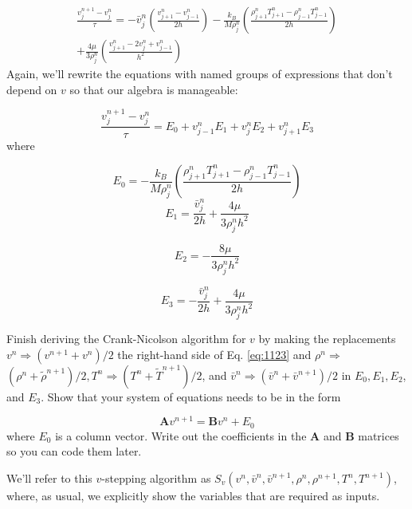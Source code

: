 \begin{equation}\label{eq:1122}
\begin{array}{r}
\frac{v_{j}^{n+1}-v_{j}^{n}}{\tau}=-\bar{v}_{j}^{n}\left(\frac{v_{j+1}^{n}-v_{j-1}^{n}}{2 h}\right)-\frac{k_{B}}{M \rho_{j}^{n}}\left(\frac{\rho_{j+1}^{n} T_{j+1}^{n}-\rho_{j-1}^{n} T_{j-1}^{n}}{2 h}\right) \\
+\frac{4 \mu}{3 \rho_{j}^{n}}\left(\frac{v_{j+1}^{n}-2 v_{j}^{n}+v_{j-1}^{n}}{h^{2}}\right)
\end{array}
\end{equation}
Again, we\rq ll rewrite the equations with named groups of expressions that don\rq t
depend on $v$ so that our algebra is manageable:


\begin{equation}\label{eq:1123}
\frac{v_{j}^{n+1}-v_{j}^{n}}{\tau}=E_{0}+v_{j-1}^{n} E_{1}+v_{j}^{n} E_{2}+v_{j+1}^{n} E_{3}
\end{equation}
where

\begin{equation}\label{eq:1124}
E_{0}=-\frac{k_{B}}{M \rho_{j}^{n}}\left(\frac{\rho_{j+1}^{n} T_{j+1}^{n}-\rho_{j-1}^{n} T_{j-1}^{n}}{2 h}\right)
\end{equation}
\begin{equation}\label{eq:1125}
E_{1}=\frac{\bar{v}_{j}^{n}}{2 h}+\frac{4 \mu}{3 \rho_{j}^{n} h^{2}}
\end{equation}

\begin{equation}\label{eq:1126}
E_{2}=-\frac{8 \mu}{3 \rho_{j}^{n} h^{2}}
\end{equation}

\begin{equation}\label{eq:1127}
E_{3}=-\frac{\bar{v}_{j}^{n}}{2 h}+\frac{4 \mu}{3 \rho_{j}^{n} h^{2}}
\end{equation}

\begin{problem}\label{P11.2}
Finish deriving the Crank-Nicolson algorithm for $v$ by making the replacements $v^{n} \Rightarrow\left(v^{n+1}+v^{n}\right) / 2$ the right-hand side of Eq. \ref{eq:1123} and $\rho^{n} \Rightarrow$ $\left(\rho^{n}+\tilde{\rho}^{n+1}\right) / 2, T^{n} \Rightarrow\left(T^{n}+\tilde{T}^{n+1}\right) / 2$, and $\bar{v}^{n} \Rightarrow\left(\bar{v}^{n}+\bar{v}^{n+1}\right) / 2$ in $E_{0}, E_{1}, E_{2}$, and $E_{3}$. Show that your system of equations needs to be in the form

\begin{equation*}
\mathbf{A} v^{n+1}=\mathbf{B} v^{n}+E_{0}
\end{equation*}
where $E_{0}$ is a column vector. Write out the coefficients in the $\mathbf{A}$ and $\mathbf{B}$ matrices so you can code them later.
\end{problem}
We\rq ll refer to this $v$-stepping algorithm as $S_{v}\left(v^{n}, \bar{v}^{n}, \bar{v}^{n+1}, \rho^{n}, \rho^{n+1}, T^{n}, T^{n+1}\right)$, where, as usual, we explicitly show the variables that are required as inputs.
